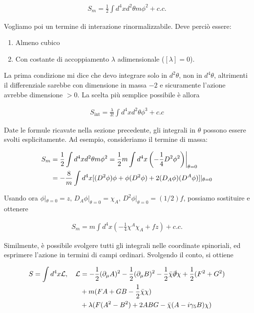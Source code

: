 \documentclass{report}
\begin{document}
\begin{align}
    S_{m} = \frac{1}{2}\int d^4x d^2\theta m\phi^2 + c.c.
\end{align}

Vogliamo poi un termine di interazione rinormalizzabile. Deve perciò essere: 

\begin{enumerate}
    \item Almeno cubico 
    \item Con costante di accoppiamento \(\lambda\) adimensionale (\([\lambda] = 0\)). 
\end{enumerate}

La prima condizione mi dice che devo integrare solo in \(d^2\theta\), non in \(d^4\theta\), altrimenti il differenziale sarebbe con dimensione in massa \(-2\) e sicuramente l'azione avrebbe dimensione \(>0\). La scelta più semplice possibile è allora 

\begin{align}
    S_{\text{int}} = \frac{\lambda}{3!}\int d^4x d^2\theta \phi^3 + c.c
\end{align}

Date le formule ricavate nella sezione precedente, gli integrali in \(\theta\) possono essere svolti esplicitamente. Ad esempio, consideriamo il termine di massa: 

\begin{align}
    S_m &= \frac{1}{2}\int d^4x d^2\theta m \phi^2 = \frac{1}{2}m\int d^4x \left(-\frac{1}{4}D^2\phi^2 \right)\biggr|_{\theta = 0} \notag \\
    &= -\frac{8}{m}\int d^4x [(D^2\phi)\phi + \phi(D^2\phi) + 2(D_A\phi)(D^A\phi)]|_{\theta = 0}
\end{align}

Usando ora \(\phi|_{\theta=0} = z, \, D_A\phi|_{\theta=0} = \chi_A, \, D^2 \phi|_{\theta=0} = (1/2) f\), possiamo sostituire e ottenere 

\begin{align}
    S_m = m \int d^4x \left(-\frac{1}{4}\chi^A \chi_A + fz \right) + c.c.
\end{align}

Similmente, è possibile svolgere tutti gli integrali nelle coordinate spinoriali, ed esprimere l'azione in termini di campi ordinari. Svolgendo il conto, si ottiene

\begin{align}
    S = \int d^4x \mathcal{L}, \quad \mathcal{L} &= -\frac{1}{2}(\partial_\mu A)^2 - \frac{1}{2}(\partial_\mu B)^2 -\frac{1}{2}\bar{\chi}\slashed{\partial}\chi + \frac{1}{2}(F^2 + G^2) \notag \\ 
    &+m(FA + GB - \frac{1}{2}\bar{\chi}\chi) \notag \\ 
    &+\lambda(F(A^2 - B^2) + 2ABG - \bar{\chi}(A-i\gamma_5 B)\chi) 
\end{align}
\end{document}
